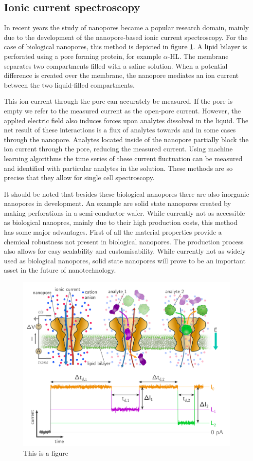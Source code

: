 \subsection{Ionic current spectroscopy}
In recent years the study of nanopores became a popular research domain, mainly
due to the development of the nanopore-based ionic current spectroscopy. For the case of
biological nanopores, this method is depicted in figure \ref{fig:IonicCurrentSpec}. A
lipid bilayer is perforated using a pore forming protein, for example $\alpha$-HL. The
membrane separates two compartments filled with a saline solution. When a potential
difference is created over the membrane, the nanopore mediates an ion current between the
two liquid-filled compartments.

This ion current through the pore can accurately be measured. If the pore is empty we
refer to the measured current as the open-pore current. However, the applied electric
field also induces forces upon analytes dissolved in the liquid. The net result of these
interactions is a flux of analytes towards and in some cases through the nanopore.
Analytes located inside of the nanopore partially block the ion current through the pore,
reducing the measured current. Using machine learning algorithms the time series of
these current fluctuation can be measured and identified with particular analytes in the
solution. These methods are so precise that they allow for single cell
spectroscopy.\cite{Howorka2009}

It should be noted that besides these biological nanopores there are also inorganic
nanopores in development\cite{Dekker2007}. An example are solid state nanopores created
by making perforations in a semi-conductor wafer. While currently not as accessible as
biological nanopres, mainly due to their high production costs, this method has some
major advantages.  First of all the material properties provide a chemical robustness not
present in biological nanopores. The production process also allows for easy scalability
and customisability. While currently not as widely used as biological nanopores, solid
state nanopores will prove to be an important asset in the future of nanotechnology.

\begin{figure}[htpb]
  \centering
  \includegraphics[width=0.6\linewidth]{Figures/IonicCurrentSpec.png}
  \caption{This is a figure}
  \label{fig:IonicCurrentSpec}
\end{figure}
